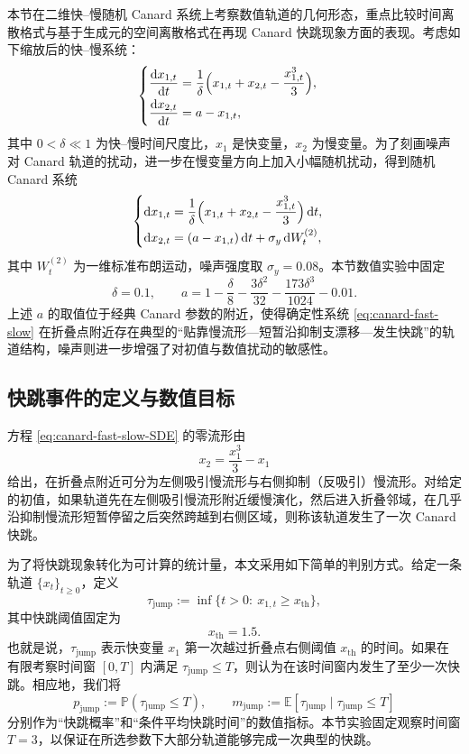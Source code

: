 本节在二维快--慢随机 Canard 系统上考察数值轨道的几何形态，重点比较时间离散格式与基于生成元的空间离散格式在再现 Canard 快跳现象方面的表现。考虑如下缩放后的快--慢系统：
\begin{equation}\label{eq:canard-fast-slow}
	\begin{cases}
		\dfrac{\mathrm{d}x_{1,t}}{\mathrm{d}t}
		= \dfrac{1}{\delta}\Bigl(x_{1,t} + x_{2,t} - \dfrac{x_{1,t}^3}{3}\Bigr),\\[6pt]
		\dfrac{\mathrm{d}x_{2,t}}{\mathrm{d}t}
		= a - x_{1,t},
	\end{cases}
\end{equation}
其中 \(0<\delta\ll 1\) 为快--慢时间尺度比，\(x_1\) 是快变量，\(x_2\) 为慢变量。为了刻画噪声对 Canard 轨道的扰动，进一步在慢变量方向上加入小幅随机扰动，得到随机 Canard 系统
\begin{equation}\label{eq:canard-fast-slow-SDE}
	\begin{cases}
		\mathrm{d}x_{1,t}
		= \dfrac{1}{\delta}\Bigl(x_{1,t} + x_{2,t} - \dfrac{x_{1,t}^3}{3}\Bigr)\,\mathrm{d}t,\\[6pt]
		\mathrm{d}x_{2,t}
		= (a - x_{1,t})\,\mathrm{d}t + \sigma_y\,\mathrm{d}W_t^{(2)},
	\end{cases}
\end{equation}
其中 \(W^{(2)}_t\) 为一维标准布朗运动，噪声强度取 \(\sigma_y=0.08\)。本节数值实验中固定
\[
\delta = 0.1,\qquad
a = 1 - \frac{\delta}{8} - \frac{3\delta^2}{32}
- \frac{173\delta^3}{1024} - 0.01.
\]
上述 \(a\) 的取值位于经典 Canard 参数的附近，使得确定性系统 \eqref{eq:canard-fast-slow} 在折叠点附近存在典型的“贴靠慢流形---短暂沿抑制支漂移---发生快跳”的轨道结构，噪声则进一步增强了对初值与数值扰动的敏感性。

\subsection{快跳事件的定义与数值目标}

方程 \eqref{eq:canard-fast-slow-SDE} 的零流形由
\[
x_2 = \frac{x_1^3}{3} - x_1
\]
给出，在折叠点附近可分为左侧吸引慢流形与右侧抑制（反吸引）慢流形。对给定的初值，如果轨道先在左侧吸引慢流形附近缓慢演化，然后进入折叠邻域，在几乎沿抑制慢流形短暂停留之后突然跨越到右侧区域，则称该轨道发生了一次 Canard 快跳。

为了将快跳现象转化为可计算的统计量，本文采用如下简单的判别方式。给定一条轨道 \(\{x_t\}_{t\ge0}\)，定义
\[
\tau_{\mathrm{jump}}
:= \inf\{t>0:\ x_{1,t}\ge x_{\mathrm{th}}\},
\]
其中快跳阈值固定为
\[
x_{\mathrm{th}} = 1.5.
\]
也就是说，\(\tau_{\mathrm{jump}}\) 表示快变量 \(x_1\) 第一次越过折叠点右侧阈值 \(x_{\mathrm{th}}\) 的时间。如果在有限考察时间窗 \([0,T]\) 内满足 \(\tau_{\mathrm{jump}}\le T\)，则认为在该时间窗内发生了至少一次快跳。相应地，我们将
\[
p_{\mathrm{jump}} := \mathbb{P}(\tau_{\mathrm{jump}}\le T),\qquad
m_{\mathrm{jump}} := \mathbb{E}[\tau_{\mathrm{jump}}\mid\tau_{\mathrm{jump}}\le T]
\]
分别作为“快跳概率”和“条件平均快跳时间”的数值指标。本节实验固定观察时间窗 \(T=3\)，以保证在所选参数下大部分轨道能够完成一次典型的快跳。

